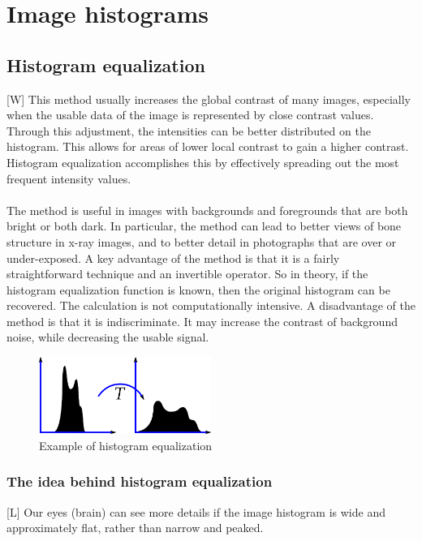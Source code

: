 \documentclass[12pt]{article}
\begin{document}
\section{Image histograms}
	\subsection{Histogram equalization}
	[W] This method usually increases the global contrast of many images, especially when the usable data
	 of the image is represented by close contrast values. Through this adjustment, the intensities 
	 can be better distributed on the histogram. This allows for areas of lower local contrast to gain 
	 a higher contrast. Histogram equalization accomplishes this by effectively spreading out the most 
	 frequent intensity values.\\
	 \\
	The method is useful in images with backgrounds and foregrounds that are both bright or both dark. 
	In particular, the method can lead to better views of bone structure in x-ray images, and to 
	better detail in photographs that are over or under-exposed. A key advantage of the method is that 
	it is a fairly straightforward technique and an invertible operator. So in theory, if the 
	histogram equalization function is known, then the original histogram can be recovered. The 
	calculation is not computationally intensive. A disadvantage of the method is that it is 
	indiscriminate. It may increase the contrast of background noise, while decreasing the usable 
	signal.
	\begin{figure}[h!]
		\centering
		\includegraphics[width=0.5\textwidth]{img/histogram_equalization.png}
		\caption{Example of histogram equalization}		
		\label{fig:histeq}
	\end{figure}
		\subsubsection{The idea behind histogram equalization}
	[L] Our eyes (brain) can see more details if the image histogram is wide and approximately
	flat, rather than narrow and peaked.
	
\end{document}
